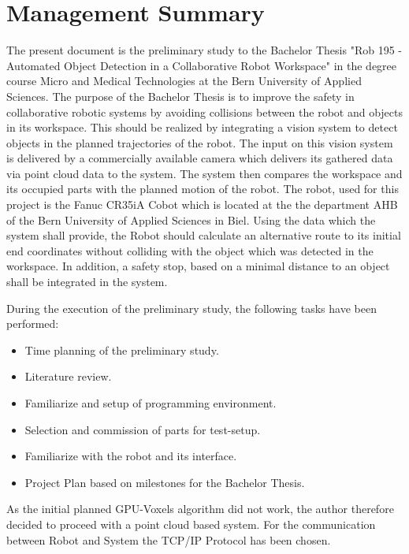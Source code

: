 \chapter*{Management Summary}
\label{chap:managementSummary}
The present document is the preliminary study to the Bachelor Thesis "Rob 195 - Automated Object Detection in a Collaborative Robot Workspace" in the degree course Micro and Medical Technologies at the Bern University of Applied Sciences.
The purpose of the Bachelor Thesis is to improve the safety in collaborative robotic systems by avoiding collisions between the robot and objects in its workspace. This should be realized by integrating a vision system to detect objects in the planned trajectories of the robot. The input on this vision system is delivered by a commercially available camera which delivers its gathered data via point cloud data to the system. The system then compares the workspace and its occupied parts with the planned motion of the robot. The robot, used for this project is the Fanuc CR35iA Cobot which is located at the the department AHB of the Bern University of Applied Sciences in Biel. Using the data which the system shall provide, the Robot should calculate an alternative route to its initial end coordinates without colliding with the object which was detected in the workspace. In addition, a safety stop, based on a minimal distance to an object shall be integrated in the system. 

During the execution of the preliminary study, the following tasks have been performed:
\begin{itemize}
	\item Time planning of the preliminary study.
	\item Literature review.
	\item Familiarize and setup of programming environment.
	\item Selection and commission of parts for test-setup.
	\item Familiarize with the robot and its interface.
	\item Project Plan based on milestones for the Bachelor Thesis.
\end{itemize}
As the initial planned GPU-Voxels algorithm did not work, the author therefore decided to proceed with a point cloud based system. For the communication between Robot and System the TCP/IP Protocol has been chosen. \newpage

